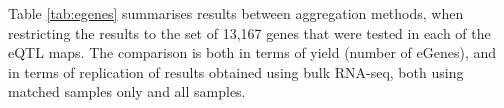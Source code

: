 Table \ref{tab:egenes} summarises results between aggregation methods, when restricting the results to the set of 13,167 genes that were tested in each of the eQTL maps.
The comparison is both in terms of yield (number of eGenes), and in terms of replication of results obtained using bulk RNA-seq, both using matched samples only and all samples. \\






